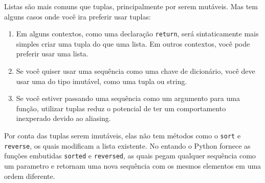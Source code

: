 Listas são mais comuns que tuplas, principalmente por serem mutáveis.
Mas tem alguns casos onde você ira preferir usar tuplas:

\begin{enumerate}

\item Em alguns contextos, como uma declaração {\tt return}, será
sintaticamente mais simples criar uma tupla do que uma lista. Em 
outros contextos, você pode preferir usar uma lista.

\item Se você quiser usar uma sequência como uma chave de dicionário,
você deve usar uma do tipo imutável, como uma tupla ou string.

\item Se você estiver passando uma sequência como um argumento para
uma função, utilizar tuplas reduz o potencial de ter um comportamento
inexperado devido ao aliasing.

\end{enumerate}

Por conta das tuplas serem imutáveis, elas não tem métodos como o
{\tt sort} e {\tt reverse}, os quais modificam a lista existente.
No entando o Python fornece as funções embutidas {\tt sorted}
e {\tt reversed}, as quais pegam qualquer sequência como um parametro
e retornam uma nova sequência com os mesmos elementos em uma ordem
diferente.


